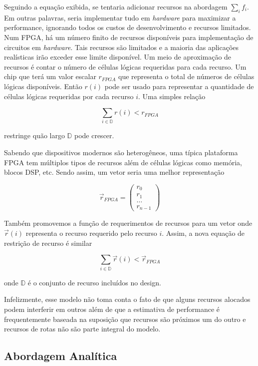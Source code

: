 Seguindo a equação exibida, se tentaria adicionar recursos na abordagem $\sum_i f_i$. Em outras palavras, seria implementar tudo em \textit{hardware} para maximizar a performance, ignorando todos os custos de desenvolvimento e recursos limitados. Num FPGA, há um número finito de recursos disponíveis para implementação de circuitos em \textit{hardware}. Tais recursos são limitados e a maioria das aplicações realísticas irão exceder esse limite disponível. Um meio de aproximação de recursos é contar o número de células lógicas requeridas para cada recurso. Um chip que terá um valor escalar $ r_{FPGA} $ que representa o total de números de células lógicas disponíveis. Então $ r(i) $ pode ser usado para representar a quantidade de células lógicas requeridas por cada recurso $ i $. Uma simples relação 

$$ \sum_{i \in \mathbb{D}} r(i) < r_{FPGA} $$

restringe quão largo $ \mathbb{D} $ pode crescer.

Sabendo que dispositivos modernos são heterogêneos, uma típica plataforma FPGA tem múltiplos tipos de recursos além de células lógicas como memória, blocos DSP, etc. Sendo assim, um vetor seria uma melhor representação

$$ 
\vec{r}_{FPGA} =
\begin{pmatrix}
r_0\\ 
r_1\\ 
\dots \\
r_{n-1}
\end{pmatrix}
$$

Também promovemos a função de requerimentos de recursos para um vetor onde $ \vec{r}(i) $ representa o recurso requerido pelo recurso $ i $. Assim, a nova equação de restrição de recurso é similar 

$$ \sum_{i \in \mathbb{D}} \vec{r}(i) < \vec{r}_{FPGA} $$

onde $ \mathbb{D} $ é o conjunto de recurso incluídos no design.

Infelizmente, esse modelo não toma conta o fato de que alguns recursos alocados podem interferir em outros além de que a estimativa de performance é frequentemente baseada na suposição que recursos são próximos um do outro e recursos de rotas não são parte integral do modelo.



\subsection{Abordagem Analítica}

